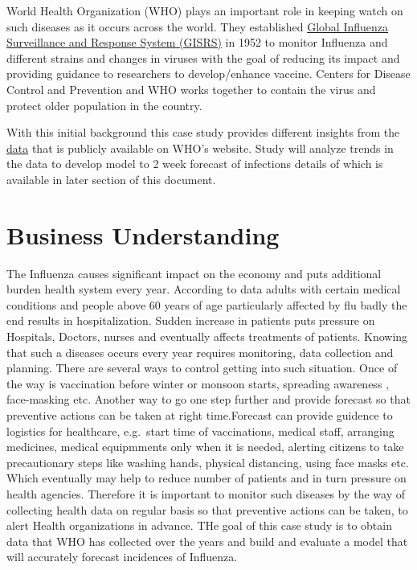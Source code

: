 \documentclass[
]{article}
\begin{document}
World Health Organization (WHO) plays an important role in keeping watch
on such diseases as it occurs across the world. They established
\href{http://www.who.int/influenza/gisrs_laboratory/en/}{Global
Influenza Surveillance and Response System (GISRS)} in 1952 to monitor
Influenza and different strains and changes in viruses with the goal of
reducing its impact and providing guidance to researchers to
develop/enhance vaccine. Centers for Disease Control and Prevention and
WHO works together to contain the virus and protect older population in
the country.

With this initial background this case study provides different insights
from the \href{https://apps.who.int/flumart/Default?ReportNo=12}{data}
that is publicly available on WHO's website. Study will analyze trends
in the data to develop model to 2 week forecast of infections details of
which is available in later section of this document.

\hypertarget{business-understanding}{%
\section{Business Understanding}\label{business-understanding}}

The Influenza causes significant impact on the economy and puts
additional burden health system every year. According to data adults
with certain medical conditions and people above 60 years of age
particularly affected by flu badly the end results in hospitalization.
Sudden increase in patients puts pressure on Hospitals, Doctors, nurses
and eventually affects treatments of patients. Knowing that such a
diseases occurs every year requires monitoring, data collection and
planning. There are several ways to control getting into such situation.
Once of the way is vaccination before winter or monsoon starts,
spreading awareness , face-masking etc. Another way to go one step
further and provide forecast so that preventive actions can be taken at
right time.Forecast can provide guidence to logistics for healthcare,
e.g.~start time of vaccinations, medical staff, arranging medicines,
medical equipmments only when it is needed, alerting citizens to take
precautionary steps like washing hands, physical distancing, using face
masks etc. Which eventually may help to reduce number of patients and in
turn pressure on health agencies. Therefore it is important to monitor
such diseases by the way of collecting health data on regular basis so
that preventive actions can be taken, to alert Health organizations in
advance. THe goal of this case study is to obtain data that WHO has
collected over the years and build and evaluate a model that will
accurately forecast incidences of Influenza.
\end{document}
